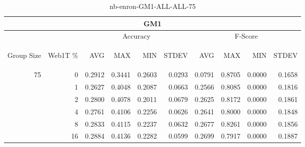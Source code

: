 \begin{center}
\begin{table}[htbp] 
 \begin{center}
\begin{tabular}{ | r | r | r | r | r | r | r | r | r | r |}
\hline
\multicolumn{10}{|c|}{GM1}\\
\hline
 & & \multicolumn{4}{|c|}{Accuracy} & \multicolumn{4}{|c|}{F-Score}\\ \cline{3-10}
\begin{sideways}Group Size\end{sideways} & \begin{sideways}Web1T \%\end{sideways} & \begin{sideways}AVG\end{sideways} & \begin{sideways}MAX\end{sideways} & \begin{sideways}MIN\end{sideways} & \begin{sideways}STDEV\end{sideways} & \begin{sideways}AVG\end{sideways} & \begin{sideways}MAX\end{sideways} & \begin{sideways}MIN\end{sideways} & \begin{sideways}STDEV\end{sideways}\\
\hline
\multirow{5}{*}{75}
 & 0 & 0.2912 & 0.3441 & 0.2603 & 0.0293 & 0.0791 & 0.8705 & 0.0000 & 0.1658\\ \cline{2-10}
 & 1 & 0.2627 & 0.4048 & 0.2087 & 0.0663 & 0.2566 & 0.8085 & 0.0000 & 0.1816\\ \cline{2-10}
 & 2 & 0.2800 & 0.4078 & 0.2011 & 0.0679 & 0.2625 & 0.8172 & 0.0000 & 0.1861\\ \cline{2-10}
 & 4 & 0.2761 & 0.4106 & 0.2256 & 0.0626 & 0.2641 & 0.8000 & 0.0000 & 0.1848\\ \cline{2-10}
 & 8 & 0.2833 & 0.4115 & 0.2237 & 0.0632 & 0.2677 & 0.8261 & 0.0000 & 0.1856\\ \cline{2-10}
 & 16 & 0.2884 & 0.4136 & 0.2282 & 0.0599 & 0.2699 & 0.7917 & 0.0000 & 0.1887\\ \cline{2-10}
\hline
\end{tabular}
\caption{nb-enron-GM1-ALL-ALL-75}
\label{table:nb-enron-GM1-ALL-ALL-75}
\end{center}
 \end{table}
\end{center}

